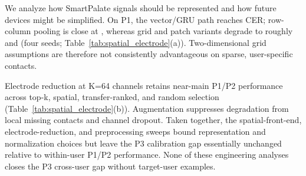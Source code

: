 We analyze how SmartPalate signals should be represented and how future devices might be simplified.
On P1, the vector/GRU path reaches  CER; row-column pooling is close at , whereas grid and patch variants degrade to roughly  and  (four seeds; Table~\ref{tab:spatial_electrode}(a)).
Two-dimensional grid assumptions are therefore not consistently advantageous on sparse, user-specific contacts.

Electrode reduction at K=64 channels retains near-main P1/P2 performance across top-k, spatial, transfer-ranked, and random selection (Table~\ref{tab:spatial_electrode}(b)).
Augmentation suppresses degradation from local missing contacts and channel dropout.
Taken together, the spatial-front-end, electrode-reduction, and preprocessing sweeps bound representation and normalization choices but leave the P3 calibration gap essentially unchanged relative to within-user P1/P2 performance.
None of these engineering analyses closes the P3 cross-user gap without target-user examples.
